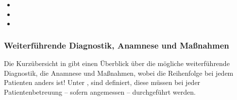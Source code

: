 \begin{itemize}
  \item {}
  \item {}
  \item {}
\end{itemize}




\subsubsection{Weiterführende Diagnostik, Anamnese und
Maßnahmen}


Die Kurzübersicht in 
 gibt einen
Überblick über die mögliche weiterführende Diagnostik, die
Anamnese und Maßnahmen, wobei die
Reihenfolge bei jedem Patienten anders ist!
Unter , 
sind  definiert, diese 
müssen bei jeder Patientenbetreuung -- sofern angemessen --
durchgeführt werden.




